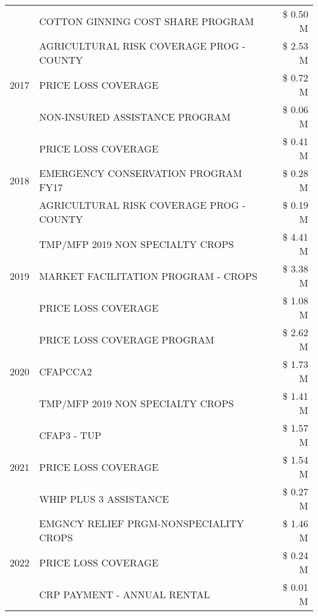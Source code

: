 \begin{tabular}{llr}
 & COTTON GINNING COST SHARE PROGRAM & \$ 0.50 M \\
\cline{1-3}
\multirow[t]{3}{*}{2017} & AGRICULTURAL RISK COVERAGE PROG - COUNTY & \$ 2.53 M \\
 & PRICE LOSS COVERAGE & \$ 0.72 M \\
 & NON-INSURED ASSISTANCE PROGRAM & \$ 0.06 M \\
\cline{1-3}
\multirow[t]{3}{*}{2018} & PRICE LOSS COVERAGE & \$ 0.41 M \\
 & EMERGENCY CONSERVATION PROGRAM FY17 & \$ 0.28 M \\
 & AGRICULTURAL RISK COVERAGE PROG - COUNTY & \$ 0.19 M \\
\cline{1-3}
\multirow[t]{3}{*}{2019} & TMP/MFP 2019 NON SPECIALTY CROPS & \$ 4.41 M \\
 & MARKET FACILITATION PROGRAM - CROPS & \$ 3.38 M \\
 & PRICE LOSS COVERAGE & \$ 1.08 M \\
\cline{1-3}
\multirow[t]{3}{*}{2020} & PRICE LOSS COVERAGE PROGRAM & \$ 2.62 M \\
 & CFAPCCA2 & \$ 1.73 M \\
 & TMP/MFP 2019 NON SPECIALTY CROPS & \$ 1.41 M \\
\cline{1-3}
\multirow[t]{3}{*}{2021} & CFAP3 - TUP & \$ 1.57 M \\
 & PRICE LOSS COVERAGE & \$ 1.54 M \\
 & WHIP PLUS 3 ASSISTANCE & \$ 0.27 M \\
\cline{1-3}
\multirow[t]{3}{*}{2022} & EMGNCY RELIEF PRGM-NONSPECIALITY CROPS & \$ 1.46 M \\
 & PRICE LOSS COVERAGE & \$ 0.24 M \\
 & CRP PAYMENT - ANNUAL RENTAL & \$ 0.01 M \\
\cline{1-3}
\bottomrule
\end{tabular}
